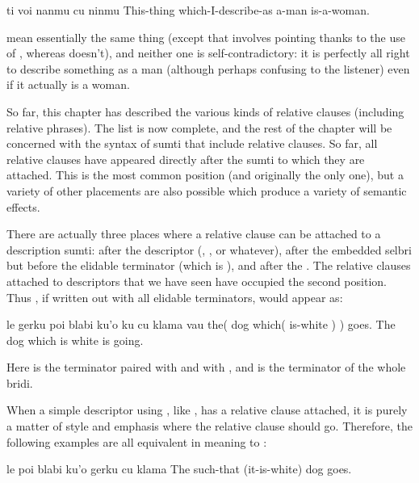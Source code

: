 \begin{example}
ti voi nanmu cu ninmu\n
This-thing which-I-describe-as a-man is-a-woman.
\end{example}

{\noindent}mean essentially the same thing (except that  involves pointing thanks to the
    use of , whereas 
    doesn't), and neither one is self-contradictory: it is
    perfectly all right to describe something as a man (although
    perhaps confusing to the listener) even if it actually is a
    woman.



So far, this chapter has described the various kinds of
    relative clauses (including relative phrases). The list is now
    complete, and the rest of the chapter will be concerned with
    the syntax of sumti that include relative clauses. So far, all
    relative clauses have appeared directly after the sumti to
    which they are attached. This is the most common position (and
    originally the only one), but a variety of other placements are
    also possible which produce a variety of semantic effects.

There are actually three places where a relative clause can
    be attached to a description sumti: after the descriptor
    (, , or whatever), after the embedded selbri but
    before the elidable terminator (which is ), and after the
    . The relative clauses attached to descriptors that we
    have seen have occupied the second position. Thus , if written out with all elidable
    terminators, would appear as:
\begin{example}
le gerku poi blabi ku'o ku cu klama vau\n
the( dog which( is-white ) ) goes.\n
The dog which is white is going.
\end{example}

Here  is the terminator paired with  and 
    with , and  is the terminator of the whole bridi. 

When a simple descriptor using , like ,
    has a relative clause attached, it is purely a matter of style
    and emphasis where the relative clause should go. Therefore,
    the following examples are all equivalent in meaning to :
\begin{example}
le poi blabi ku'o gerku cu klama\n
The such-that (it-is-white) dog goes.
\end{example}

